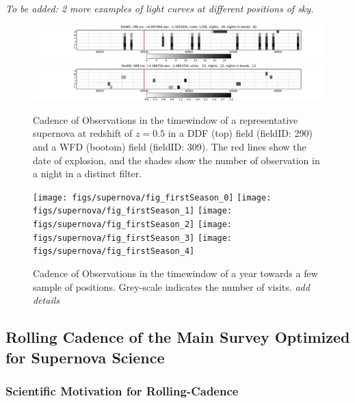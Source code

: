 \emph{To be added: 2 more examples of light curves at different positions of sky.}







\begin{figure}[tbh!]
\includegraphics[angle=0,width=\textwidth,clip]{figs/SN_Cadence_290.pdf}
\includegraphics[angle=0,width=\textwidth,clip]{figs/SN_Cadence_309.pdf}
\caption{Cadence of Observations in the timewindow of a representative supernova at redshift of $z=0.5$ in a DDF (top) field (fieldID: 290) and a WFD (bootom) field (fieldID: 309). The red lines show the date of explosion, and the shades show the number of observation in a night in a distinct filter.}
\label{fig:perSNCadence}
\end{figure}



\begin{figure}[!hb]
    \begin{minipage}[b]{\linewidth}
        \texttt{[image: figs/supernova/fig\_firstSeason\_0]}
        \texttt{[image: figs/supernova/fig\_firstSeason\_1]}
        \texttt{[image: figs/supernova/fig\_firstSeason\_2]}
        \texttt{[image: figs/supernova/fig\_firstSeason\_3]}
        \texttt{[image: figs/supernova/fig\_firstSeason\_4]}
    \end{minipage}
\label{fig:opsimSummary}
\caption{Cadence of Observations in the timewindow of a year towards a few sample of 
positions. Grey-scale indicates the number of visits. {\it add details} 
}
\end{figure}


\subsection{Rolling Cadence of the Main Survey Optimized for Supernova Science}
\subsubsection{ Scientific Motivation for Rolling-Cadence}

